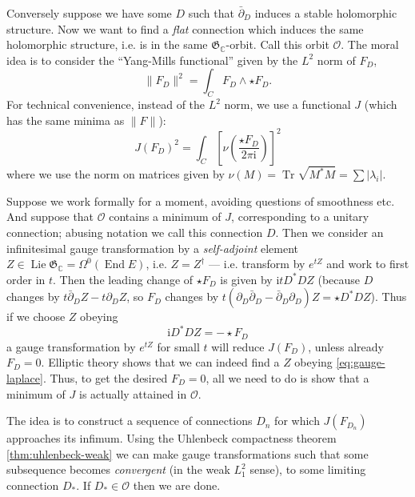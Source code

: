 \documentclass[12pt,letterpaper,reqno]{article}
\numberwithin{equation}{section}
\newcommand{\fG}{{\mathfrak G}}
\newcommand{\cO}{\ensuremath{\mathcal O}}
\newcommand{\C}{\ensuremath{\mathbb C}}
\newcommand{\I}{{\mathrm i}}
\newcommand{\abs}[1]{\lvert#1\rvert}
\newcommand{\norm}[1]{\lVert#1\rVert}
\newcommand{\ti}[1]{\textit{#1}}
\DeclareMathOperator{\Tr}{Tr}
\DeclareMathOperator{\End}{End}
\DeclareMathOperator{\Lie}{Lie}
\newcommand{\fixme}[1]{{\color{orange}{[#1]}}}
\begin{document}
\begin{pf}
Conversely suppose we have some $D$ such that $\bar\partial_D$
induces a stable holomorphic structure. Now we want to find a
\ti{flat} connection which induces the same holomorphic structure,
i.e. is in the same $\fG_\C$-orbit. Call this orbit $\cO$.
The moral idea is to consider the ``Yang-Mills functional''
given by the $L^2$ norm of $F_D$,
\begin{equation}
 \norm{F_D}^2 = \int_C F_D \wedge \star F_D.
\end{equation}
For technical convenience, instead of the $L^2$ norm, we
use a functional $J$
(which has the same minima as $\norm{F}$):
\begin{equation}
  J(F_D)^2 = \int_C \left[\nu\left(\frac{\star F_D}{2 \pi \I}\right)\right]^2
\end{equation}
where we use the norm on matrices given by
$\nu(M) = \Tr \sqrt{M^*M} = \sum \abs{\lambda_i}$.

Suppose we work formally for a moment, avoiding questions of
smoothness etc.
And suppose that $\cO$ contains a minimum of $J$, corresponding
to a unitary connection; abusing notation we call this connection $D$.
Then we consider an infinitesimal gauge transformation by
a \ti{self-adjoint} element
$Z \in \Lie \fG_\C = \Omega^0(\End E)$, i.e. $Z = Z^\dagger$ ---
i.e. transform by $e^{tZ}$ and work to first order in $t$.
Then the leading change of $\star F_D$ is given by $\I t D^* D Z$
(because $D$ changes by $t \bar\partial_D Z - t \partial_D Z$,
so $F_D$ changes by $t (\partial_D \bar\partial_D - \bar\partial_D \partial_D) Z = \star D^* D Z$). \fixme{check sign}
Thus if we choose $Z$ obeying
\begin{equation} \label{eq:gauge-laplace}
  \I D^* D Z = -\star F_D
\end{equation}
a gauge transformation by $e^{t Z}$ for small $t$
will reduce $J(F_D)$, unless
already $F_D = 0$. Elliptic theory shows that we can indeed
find a $Z$ obeying \eqref{eq:gauge-laplace}.
Thus, to get the desired $F_D = 0$,
all we need to do is show that a
minimum of $J$ is actually attained in $\cO$.

The idea is to construct a
sequence of connections $D_n$ for which
$J(F_{D_n})$ approaches its infimum.
Using the Uhlenbeck compactness
theorem \autoref{thm:uhlenbeck-weak} we can make gauge transformations
such that some subsequence becomes \ti{convergent}
(in the weak $L^2_1$ sense), to
some limiting connection $D_*$. If
$D_* \in \cO$ then we are done.


\end{pf}
\end{document}
